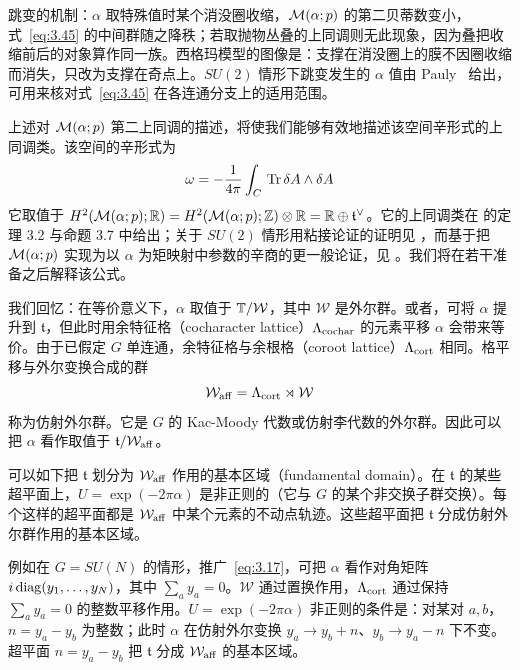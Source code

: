 \begin{yizhu}[物理图像补充]跳变的机制：$\alpha$ 取特殊值时某个消没圈收缩，${\mathcal{M}}(\alpha;p)$ 的第二贝蒂数变小，式~\eqref{eq:3.45} 的中间群随之降秩；若取抛物丛叠的上同调则无此现象，因为叠把收缩前后的对象算作同一族。西格玛模型的图像是：支撑在消没圈上的膜不因圈收缩而消失，只改为支撑在奇点上。$SU(2)$ 情形下跳变发生的 $\alpha$ 值由 Pauly~\cite{ref55} 给出，可用来核对式~\eqref{eq:3.45} 在各连通分支上的适用范围。\end{yizhu}

上述对 ${\mathcal{M}}(\alpha;p)$ 第二上同调的描述，将使我们能够有效地描述该空间辛形式的上同调类。该空间的辛形式为
\setcounter{equation}{48}
\begin{equation}\label{eq:3.49}
  \omega=-{1\over 4\pi}\int_C\,{\rm Tr}\,\delta A\wedge
\delta A
\end{equation}
它取值于 $H^2({\mathcal{M}}(\alpha;p);{\mathbb{R}})=H^2({\mathcal{M}}(\alpha;p);{\mathbb{Z}})\otimes{\mathbb{R}}=
{\mathbb{R}}\oplus {\mathfrak t}^\vee$。它的上同调类在 \cite{ref56} 的定理 3.2 与命题 3.7 中给出；关于 $SU(2)$ 情形用粘接论证的证明见 \cite{ref57}，而基于把 ${\mathcal{M}}(\alpha;p)$ 实现为以 $\alpha$ 为矩映射中参数的辛商的更一般论证，见 \cite{ref58}。我们将在若干准备之后解释该公式。

\bigskip{}

我们回忆：在等价意义下，$\alpha$ 取值于 ${\mathbb{T}}/{\mathcal W}$，其中 ${\mathcal W}$ 是外尔群。或者，可将 $\alpha$ 提升到 $\mathfrak t$，但此时用余特征格（cocharacter lattice）$\Lambda_{\rm cochar}$ 的元素平移 $\alpha$ 会带来等价。由于已假定 $G$ 单连通，余特征格与余根格（coroot lattice）$\Lambda_{\rm cort}$ 相同。格平移与外尔变换合成的群
\setcounter{equation}{49}
\begin{equation}\label{eq:3.50}
  {\mathcal W}_{\rm aff}=\Lambda_{\rm cort}\rtimes {\mathcal W}
\end{equation}
称为仿射外尔群。它是 $G$ 的 Kac-Moody 代数或仿射李代数的外尔群。因此可以把 $\alpha$ 看作取值于 $\mathfrak t/{\mathcal W}_{\rm aff}$。

可以如下把 $\mathfrak t$ 划分为 ${\mathcal W}_{\rm aff}$ 作用的基本区域（fundamental domain）。在 $\mathfrak t$ 的某些超平面上，$U=\exp(-2 \pi\alpha)$ 是非正则的（它与 $G$ 的某个非交换子群交换）。每个这样的超平面都是 ${\mathcal W}_{\rm aff}$ 中某个元素的不动点轨迹。这些超平面把 $\mathfrak t$ 分成仿射外尔群作用的基本区域。

例如在 $G=SU(N)$ 的情形，推广~\eqref{eq:3.17}，可把 $\alpha$ 看作对角矩阵 $i\,{\rm diag}(y_1,\dots,y_N)$，其中 $\sum_a y_a=0$。${\mathcal W}$ 通过置换作用，$\Lambda_{\rm cort}$ 通过保持 $\sum_a y_a=0$ 的整数平移作用。$U=\exp(-2\pi\alpha)$ 非正则的条件是：对某对 $a,b$，$n=y_a-y_b$ 为整数；此时 $\alpha$ 在仿射外尔变换 $y_a\to y_b+n$、$y_b\to y_a-n$ 下不变。超平面 $n=y_a-y_b$ 把 $\mathfrak t$ 分成 ${\mathcal W}_{\rm aff}$ 的基本区域。

